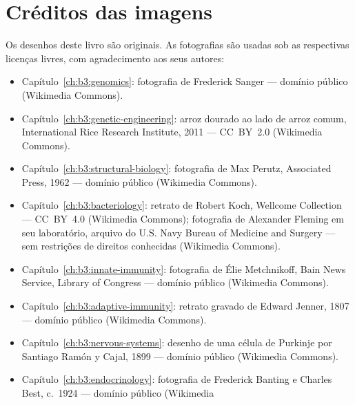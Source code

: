 \chapter*{Créditos das imagens}

\begingroup\sloppy

Os desenhos deste livro são originais. As fotografias são usadas sob
as respectivas licenças livres, com agradecimento aos seus autores:

\begin{itemize}
  \item Capítulo~\ref{ch:b3:genomics}: fotografia de Frederick Sanger
        --- domínio público (Wikimedia Commons).
  \item Capítulo~\ref{ch:b3:genetic-engineering}: arroz dourado ao lado
        de arroz comum, International Rice Research Institute, 2011 ---
        CC~BY~2.0 (Wikimedia Commons).
  \item Capítulo~\ref{ch:b3:structural-biology}: fotografia de Max
        Perutz, Associated Press, 1962 --- domínio público (Wikimedia
        Commons).
  \item Capítulo~\ref{ch:b3:bacteriology}: retrato de Robert Koch,
        Wellcome Collection --- CC~BY~4.0 (Wikimedia Commons);
        fotografia de Alexander Fleming em seu laboratório, arquivo do
        U.S. Navy Bureau of Medicine and Surgery --- sem restrições de
        direitos conhecidas (Wikimedia Commons).
  \item Capítulo~\ref{ch:b3:innate-immunity}: fotografia de Élie
        Metchnikoff, Bain News Service, Library of Congress --- domínio
        público (Wikimedia Commons).
  \item Capítulo~\ref{ch:b3:adaptive-immunity}: retrato gravado de
        Edward Jenner, 1807 --- domínio público (Wikimedia Commons).
  \item Capítulo~\ref{ch:b3:nervous-systems}: desenho de uma célula de
        Purkinje por Santiago Ramón y Cajal, 1899 --- domínio público
        (Wikimedia Commons).
  \item Capítulo~\ref{ch:b3:endocrinology}: fotografia de Frederick
        Banting e Charles Best, c.~1924 --- domínio público (Wikimedia

\end{itemize}
